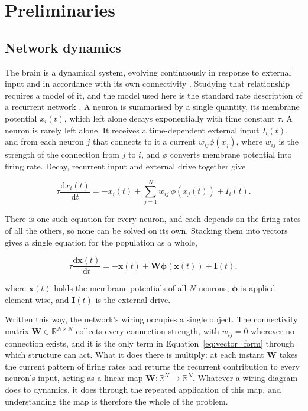 \chapter{Preliminaries}
\label{chapter:prelims}




\section{Network dynamics}
\label{section:ch2_1}
\bigskip

The brain is a dynamical system, evolving continuously in response to external input and in
accordance with its own connectivity \cite{vogels2005neural,rajan2010stimulus,shenoy2011dynamical}.
Studying that relationship requires a model of it, and the model used here is the standard rate
description of a recurrent network \cite{breakspear2017dynamic,sussillo2014neural}. A neuron is
summarised by a single quantity, its membrane potential $x_i(t)$, which left alone decays
exponentially with time constant $\tau$. A neuron is rarely left alone. It receives a
time-dependent external input $I_i(t)$, and from each neuron $j$ that connects to it a current
$w_{ij}\phi(x_j)$, where $w_{ij}$ is the strength of the connection from $j$ to $i$, and $\phi$ converts
membrane potential into firing rate. Decay, recurrent input and external drive together give

\begin{equation}
    \tau \frac{\mathrm{d}x_i(t)}{\mathrm{d}t} = -x_i(t) + \sum_{j=1}^{N} w_{ij}\,\phi(x_j(t)) + I_i(t).
    \label{eq:membrane_potential}
\end{equation}

There is one such equation for every neuron, and each depends on the firing rates of all the others,
so none can be solved on its own. Stacking them into vectors gives a single equation for the
population as a whole,

\begin{equation}
    \tau \frac{\mathrm{d}\mathbf{x}(t)}{\mathrm{d}t} = -\mathbf{x}(t) + \mathbf{W}\boldsymbol{\phi}(\mathbf{x}(t)) + \mathbf{I}(t),
    \label{eq:vector_form}
\end{equation}

where $\mathbf{x}(t)$ holds the membrane potentials of all $N$ neurons, $\boldsymbol{\phi}$ is applied
element-wise, and $\mathbf{I}(t)$ is the external drive.

Written this way, the network's wiring occupies a single object. The connectivity matrix
$\mathbf{W} \in \mathbb{R}^{N \times N}$ collects every connection strength, with $w_{ij} = 0$
wherever no connection exists, and it is the only term in Equation~\ref{eq:vector_form} through
which structure can act. What it does there is multiply: at each instant $\mathbf{W}$ takes the
current pattern of firing rates and returns the recurrent contribution to every neuron's input,
acting as a linear map $\mathbf{W} : \mathbb{R}^{N} \to \mathbb{R}^{N}$. Whatever a wiring diagram
does to dynamics, it does through the repeated application of this map, and understanding the map is
therefore the whole of the problem.

